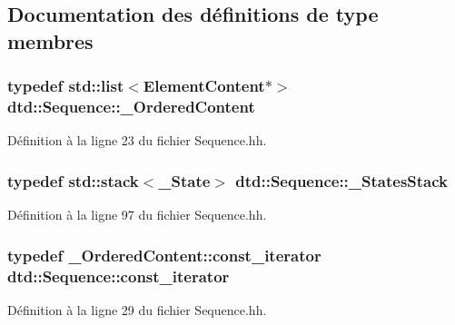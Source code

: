 \subsection{Documentation des définitions de type membres}
\hypertarget{classdtd_1_1_sequence_ae8f07ee87cfe7be8dd9eb5bf01959d66}{
\subsubsection[{\_\-OrderedContent}]{\setlength{\rightskip}{0pt plus 5cm}typedef std::list$<${\bf ElementContent}$\ast$$>$ {\bf dtd::Sequence::\_\-OrderedContent}}}
\label{classdtd_1_1_sequence_ae8f07ee87cfe7be8dd9eb5bf01959d66}


Définition à la ligne 23 du fichier Sequence.hh.

\hypertarget{classdtd_1_1_sequence_a779e1658dfabe1973ec9a2524501bc88}{
\subsubsection[{\_\-StatesStack}]{\setlength{\rightskip}{0pt plus 5cm}typedef std::stack$<${\bf \_\-State}$>$ {\bf dtd::Sequence::\_\-StatesStack}}}
\label{classdtd_1_1_sequence_a779e1658dfabe1973ec9a2524501bc88}


Définition à la ligne 97 du fichier Sequence.hh.

\hypertarget{classdtd_1_1_sequence_a497ef84646eebfccfb0b47ca526dd5cd}{
\subsubsection[{const\_\-iterator}]{\setlength{\rightskip}{0pt plus 5cm}typedef \_\-OrderedContent::const\_\-iterator {\bf dtd::Sequence::const\_\-iterator}}}
\label{classdtd_1_1_sequence_a497ef84646eebfccfb0b47ca526dd5cd}


Définition à la ligne 29 du fichier Sequence.hh.

